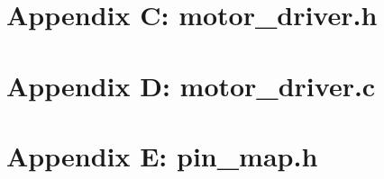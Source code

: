 \documentclass[letterpaper,11pt]{texMemo} %
\begin{document}
\section*{Appendix C: motor\_driver.h}
\begin{tiny}

\end{tiny}
\newpage

\section*{Appendix D: motor\_driver.c}
\begin{tiny}

\end{tiny}
\newpage

\section*{Appendix E: pin\_map.h}
\begin{tiny}

\end{tiny}
\newpage
\end{document}

